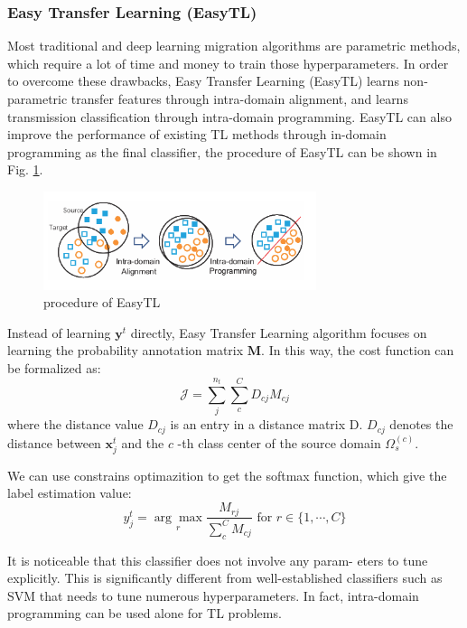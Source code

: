 \documentclass[conference]{IEEEtran}
\begin{document}
\subsubsection{Easy Transfer Learning (EasyTL)}

Most traditional and deep learning migration algorithms are parametric methods, which require a lot of time and money to train those hyperparameters. In order to overcome these drawbacks, Easy Transfer Learning (EasyTL) \cite{Wang2019Easy} learns non-parametric transfer features through intra-domain alignment, and learns transmission classification through intra-domain programming. EasyTL can also improve the performance of existing TL methods through in-domain programming as the final classifier, the procedure of EasyTL can be shown in Fig. \ref{kFig1}. 

\begin{center}
	\begin{figure}[htbp]
		\centering
		\label{kFig1}
		\includegraphics[width=8cm]{image/easyTL.png}
		\caption{procedure of EasyTL\cite{Wang2019Easy}}
	\end{figure}
\end{center}

Instead of learning $\mathbf{y}^{t}$ directly, Easy Transfer Learning algorithm focuses on learning the probability annotation matrix $\mathbf{M}$. In this way, the cost function can be formalized as:
$$
\mathcal{J}=\sum_{j}^{n_{t}} \sum_{c}^{C} D_{c j} M_{c j}
$$
where the distance value $D_{c j}$ is an entry in a distance matrix
D. $D_{c j}$ denotes the distance between $\mathbf{x}_{j}^{t}$ and the $c$ -th class center of the source domain $\Omega_{s}^{(c)}$.

We can use constrains optimazition to get the softmax function, which give the label estimation value:
$$
y_{j}^{t}=\underset{r}{\arg \max } \frac{M_{r j}}{\sum_{c}^{C} M_{c j}} \text { for } r \in\{1, \cdots, C\}
$$

It is noticeable that this classifier does not involve any param- eters to tune explicitly. This is significantly different from well-established classifiers such as SVM that needs to tune numerous hyperparameters. In fact, intra-domain programming can be used alone for TL problems.
\end{document}
